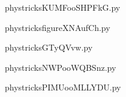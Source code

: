     

    \clearpage
    


    \newcommand{\CaptionFigKUMFooSHPFkG}{<+Type your caption here+>}
    \begin{center}
        
    \end{center}
    phystricksKUMFooSHPFkG.py

    

    \clearpage
    


    \newcommand{\CaptionFigfigureXNAufCh}{<+Type your caption here+>}
    \begin{center}
        
    \end{center}
    phystricksfigureXNAufCh.py

    

    \clearpage
    


    \newcommand{\CaptionFigGTyQVvw}{<+Type your caption here+>}
    \begin{center}
        
    \end{center}
    phystricksGTyQVvw.py

    

    \clearpage
    


    \newcommand{\CaptionFigNWPooWQBSnz}{<+Type your caption here+>}
    \begin{center}
        
    \end{center}
    phystricksNWPooWQBSnz.py

    

    \clearpage
    


    \newcommand{\CaptionFigPIMUooMLLYDU}{<+Type your caption here+>}
    \begin{center}
        
    \end{center}
    phystricksPIMUooMLLYDU.py

    

    \clearpage
    


